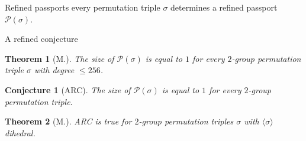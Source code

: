 \documentclass[handout,xcolor=dvipsnames]{beamer}
\theoremstyle{plain}
\newtheorem*{thm}{Theorem}
\newtheorem*{conj}{Conjecture}
\begin{document}
{\begin{frame}{Refined passports}
      every permutation triple $\sigma$
      determines a refined passport
      $\mathscr{P}(\sigma)$.
    \end{frame}
    \begin{frame}{A refined conjecture}
      \begin{thm}[M.]
        \vspace{1pt}
        The size of $\mathscr{P}(\sigma)$ is
        equal to $1$ for every
        $2$-group permutation triple
        $\sigma$ with degree $\leq 256$.
      \end{thm}
      \pause\par
      \begin{conj}[ARC]
        \vspace{1pt}
        The size of $\mathscr{P}(\sigma)$ is
        equal to $1$ for every
        $2$-group permutation triple.
      \end{conj}
      \pause\par
      \begin{thm}[M.]
        \vspace{1pt}
        ARC is true for $2$-group permutation triples $\sigma$
        with $\langle\sigma\rangle$ dihedral.
      \end{thm}
    \end{frame}
  }
\end{document}
